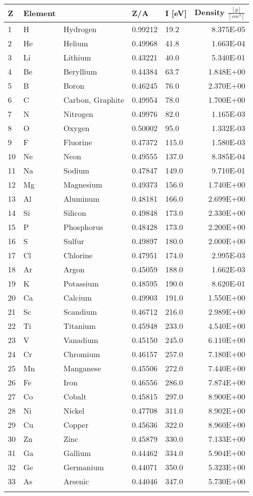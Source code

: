 \begin{tabular}{l|l|l|l|l|r}

Z & Element &   & Z/A & I [eV] & Density $\frac{[g]}{[cm^3]}$ \\
\hline
1 &	H &	 	Hydrogen &	 	0.99212 &	 	19.2 &	 	8.375E-05 \\
2 &	He &	Helium &	0.49968 &	41.8 &	1.663E-04 \\
3 & Li &	Lithium &	0.43221 &	40.0 &	5.340E-01 \\
4 &	Be &	Beryllium &	0.44384 &	63.7 &	1.848E+00 \\ 
5 &	B &	Boron &	0.46245 &	76.0 &	2.370E+00 \\
6 &	C &	Carbon, Graphite &	0.49954 &	78.0 &	1.700E+00 \\
7 &	N &	Nitrogen &	0.49976 &	82.0 &	1.165E-03 \\
8 &	O &	Oxygen &	0.50002 &	95.0 &	1.332E-03 \\
9 &	F &	Fluorine &	0.47372 &	115.0 &	1.580E-03 \\
10 &	Ne &	Neon &	0.49555 &	137.0 &	8.385E-04 \\
11 &	Na &	Sodium &	0.47847 &	149.0 &	9.710E-01 \\
12 &	Mg &	Magnesium &	0.49373 &	156.0 &	1.740E+00 \\
13 &	Al &	Aluminum &	0.48181 &	166.0 &	2.699E+00 \\
14 &	Si &	Silicon &	0.49848 &	173.0 &	2.330E+00 \\
15 &	P &	Phosphorus &	0.48428 &	173.0 &	2.200E+00 \\
16 &	S &	Sulfur &	0.49897 &	180.0 &	2.000E+00 \\
17 &	Cl &	Chlorine &	0.47951 &	174.0 &	2.995E-03 \\
18 &	Ar &	Argon &	0.45059 &	188.0 &	1.662E-03 \\
19 &	K &	Potassium &	0.48595 &	190.0 &	8.620E-01 \\
20 &	Ca &	Calcium &	0.49903 &	191.0 &	1.550E+00 \\
21 &	Sc &	Scandium &	0.46712 &	216.0 &	2.989E+00 \\
22 &	Ti &	Titanium &	0.45948 &	233.0 &	4.540E+00 \\
23 &	V &	Vanadium &	0.45150 &	245.0 &	6.110E+00 \\
24 &	Cr &	Chromium &	0.46157 &	257.0 &	7.180E+00 \\
25 &	Mn &	Manganese &	0.45506 &	272.0 &	7.440E+00 \\
26 &	Fe &	Iron &	0.46556 &	286.0 &	7.874E+00 \\
27 &	Co &	Cobalt &	0.45815 &	297.0 &	8.900E+00 \\
28 &	Ni &	Nickel &	0.47708 &	311.0 &	8.902E+00 \\
29 &	Cu &	Copper &	0.45636 &	322.0 &	8.960E+00 \\
30 &	Zn &	Zinc &	0.45879 &	330.0 &	7.133E+00 \\
31 &	Ga &	Gallium &	0.44462 &	334.0 &	5.904E+00 \\
32 &	Ge &	Germanium &	0.44071 &	350.0 &	5.323E+00 \\
33 &	As &	Arsenic &	0.44046 &	347.0 &	5.730E+00 \\

\label{table: absorption coeff.}
\end{tabular}
